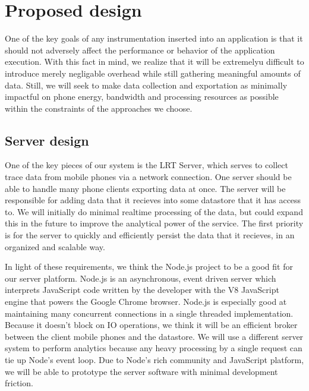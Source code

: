 \section{Proposed design}
\label{section:proposeddesign}
One of the key goals of any instrumentation inserted into an application is 
that it should not adversely affect the performance or behavior of the 
application execution. With this fact in mind, we realize that it will be 
extremelyu difficult to introduce merely negligable overhead while still gathering
meaningful amounts of data. Still, we will seek to make data collection
and exportation as minimally impactful on phone energy, bandwidth and processing
resources as possible within the constraints of the approaches we choose.

\subsection{Server design}
One of the key pieces of our system is the LRT Server, which serves
to collect trace data from mobile phones via a network connection.
One server should be able to handle many phone clients exporting data at once.
The server will be responsible for adding data that it recieves into
some datastore that it has access to. We will initially do minimal realtime
processing of the data, but could expand this in the future to improve the
analytical power of the service. The first priority is for the server to quickly
and efficiently persist the data that it recieves, in an organized
and scalable way.

In light of these requirements, we think the Node.js \cite{node}
project to be a good fit for our server platform.
Node.js is an asynchronous, event driven server 
which interprets JavaScript code written by the developer with the 
V8 JavaScript engine \cite{V8-javascript} that
powers the Google Chrome browser. Node.js is especially good
at maintaining many concurrent connections in a single threaded implementation.
Because it doesn't block on IO operations, we think it will be an efficient broker
between the client mobile phones and the datastore. We will use a different server
system to perform analytics
because any heavy processing by a single request can tie up Node's event loop.
Due to Node's rich community and JavaScript platform,
we will be able to prototype the server software with minimal development friction.

